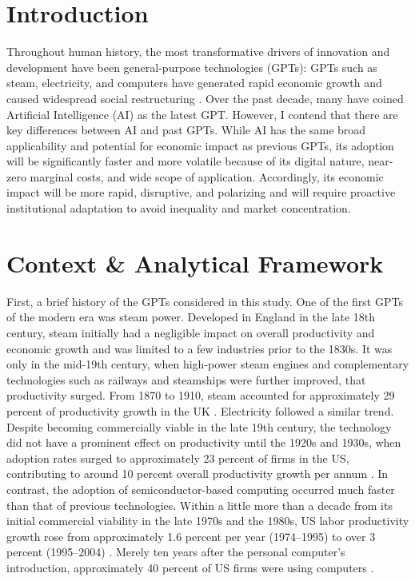 \documentclass[12pt, a4paper, twoside]{article}
\begin{document}
\maketitle{}

\section{Introduction}

Throughout human history, the most transformative drivers of innovation and development have been general-purpose technologies (GPTs): GPTs such as steam, electricity, and computers have generated rapid economic growth and caused widespread social restructuring \autocite[p.\ 0]{BresnahanTrajtenberg1995GPT}. Over the past decade, many have coined Artificial Intelligence (AI) as the latest GPT. However, I contend that there are key differences between AI and past GPTs. While AI has the same broad applicability and potential for economic impact as previous GPTs, its adoption will be significantly faster and more volatile because of its digital nature, near-zero marginal costs, and wide scope of application. Accordingly, its economic impact will be more rapid, disruptive, and polarizing and will require proactive institutional adaptation to avoid inequality and market concentration.

\section{Context \& Analytical Framework}

First, a brief history of the GPTs considered in this study. One of the first GPTs of the modern era was steam power. Developed in England in the late 18th century, steam initially had a negligible impact on overall productivity and economic growth and was limited to a few industries prior to the 1830s. It was only in the mid-19th century, when high-power steam engines and complementary technologies such as railways and steamships were further improved, that productivity surged. From 1870 to 1910, steam accounted for approximately 29 percent of productivity growth in the UK \autocite[p.\ 524]{Crafts2021AIasGPT}. Electricity followed a similar trend. Despite becoming commercially viable in the late 19th century, the technology did not have a prominent effect on productivity until the 1920s and 1930s, when adoption rates surged to approximately 23 percent of firms in the US, contributing to around 10 percent overall productivity growth per annum \autocite[pp.\ 16--17]{FilippucciGalLaengleSchief2025OECDG7ProductivityGainsAI}. In contrast, the adoption of semiconductor-based computing occurred much faster than that of previous technologies. Within a little more than a decade from its initial commercial viability in the late 1970s and the 1980s, US labor productivity growth rose from approximately 1.6 percent per year (1974–1995) to over 3 percent (1995–2004) \autocite[p.\ 525]{Crafts2021AIasGPT}. Merely ten years after the personal computer’s introduction, approximately 40 percent of US firms were using computers \autocite[p.\ 16]{FilippucciGalLaengleSchief2025OECDG7ProductivityGainsAI}.
\end{document}
